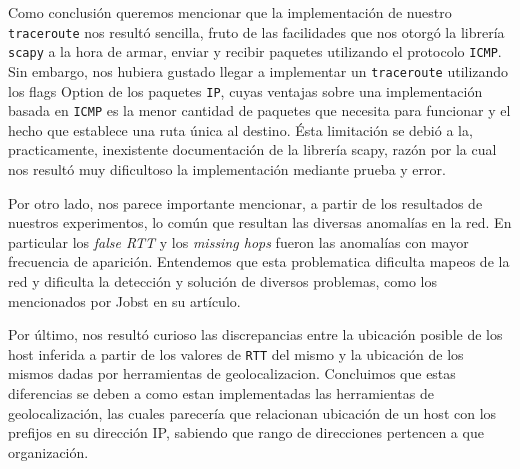Como conclusión queremos mencionar que la implementación de nuestro \texttt{traceroute} nos resultó sencilla, fruto de las facilidades que nos otorgó la librería \texttt{scapy} a la hora de armar, enviar y recibir paquetes utilizando el protocolo \texttt{ICMP}. Sin embargo, nos hubiera gustado llegar a implementar un \texttt{traceroute} utilizando los flags Option de los paquetes \texttt{IP}, cuyas ventajas sobre una implementación basada en \texttt{ICMP} es la menor cantidad de paquetes que necesita para funcionar y el hecho que establece una ruta única al destino. Ésta limitación se debió a la, practicamente, inexistente documentación de la librería scapy, razón por la cual nos resultó muy dificultoso la implementación mediante prueba y error.

Por otro lado, nos parece importante mencionar, a partir de los resultados de nuestros experimentos, lo común que resultan las diversas anomalías en la red. En particular los \textit{false RTT} y los \textit{missing hops} fueron las anomalías con mayor frecuencia de aparición. Entendemos que esta problematica dificulta mapeos de la red y dificulta la detección y solución de diversos problemas, como los mencionados por Jobst en su artículo\cite{Jobst}.

Por último, nos resultó curioso las discrepancias entre la ubicación posible de los host inferida a partir de los valores de \texttt{RTT} del mismo y la ubicación de los mismos dadas por herramientas de geolocalizacion. Concluimos que estas diferencias se deben a como estan implementadas las herramientas de geolocalización, las cuales parecería que relacionan ubicación de un host con los prefijos en su dirección IP, sabiendo que rango de direcciones pertencen a que organización.
